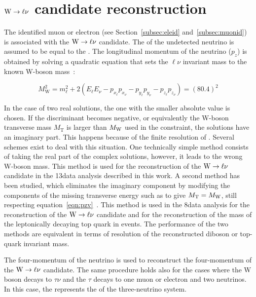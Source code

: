 \section{$\mathrm{W}\to\ell\nu$ candidate reconstruction}\label{sec:leptonicW}

The identified muon or electron (see Section~\ref{subsec:eleid} and~\ref{subsec:muonid}) is associated with the $\mathrm{W}\to\ell\nu$ candidate. 
The \Vpt of the undetected neutrino is assumed to be equal to the \ptvecmiss. The longitudinal momentum of the neutrino ($p_z$) is obtained by solving a quadratic equation that sets the $\ell\nu$ invariant
mass to the known W-boson mass~\cite{Olive:2016xmw}:

\begin{equation}\label{eqn:pzv}
M_\mathrm{W}^2 = m_\ell^2   + 2(E_\ell E_\nu - p_{x_\ell}p_{x_\nu} - p_{y_\ell}p_{y_\nu} - p_{z_\ell}p_{z_\nu} ) = (80.4)^2
\end{equation}

In the case of two real solutions, the one with the smaller absolute value is chosen.
If the discriminant becomes negative, or equivalently the W-boson transverse mass $M_\mathrm{T}$ is larger than $M_\mathrm{W}$ used in the constraint, the solutions have an imaginary part. This happens because of the finite resolution of \ETmiss.
Several schemes exist to deal with this situation. One technically simple method consists of taking the real part of the complex solutions, however, it leads to the wrong W-boson mass. This method is used for the reconstruction of the $\mathrm{W}\to\ell\nu$ candidate in the 13\TeV data analysis described in this work.
A second method has been studied, which eliminates the imaginary component by modifying the components of the missing transverse energy such as to give $M_\mathrm{T} =  M_\mathrm{W}$, still respecting equation~\ref{eqn:pzv}~\cite{BauerPhd10}. This method is used in the 8\TeV data analysis for the reconstruction of the $\mathrm{W}\to\ell\nu$ candidate and for the reconstruction of the mass of the leptonically decaying top quark in \ttbar events. The performance of the two methods are equivalent in terms of resolution of the reconstructed diboson or top-quark invariant mass.

The four-momentum of the neutrino is used to reconstruct the four-momentum of the $\mathrm{W}\to\ell\nu$ candidate.
The same procedure holds also for the cases where the W boson decays to $\tau\nu$ and the $\tau$ decays to one muon or electron and two neutrinos.
In this case, the \ptvecmiss represents the \Vpt of the three-neutrino system.